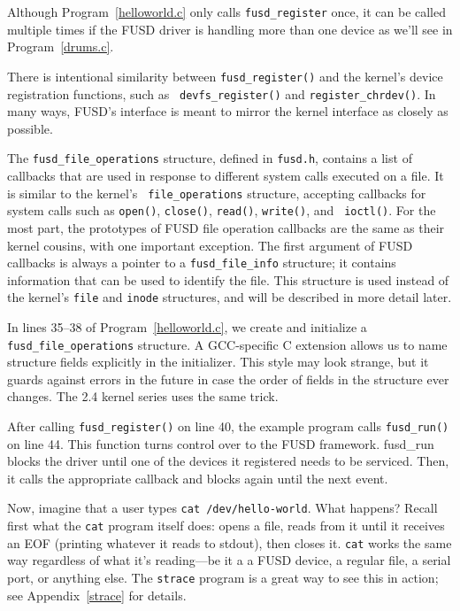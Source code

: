 \documentclass{article}
\begin{document}
Although Program~\ref{helloworld.c} only calls {\tt fusd\_register}
once, it can be called multiple times if the FUSD driver is handling
more than one device as we'll see in Program~\ref{drums.c}.

There is intentional similarity between {\tt fusd\_register()} and the
kernel's device registration functions, such as {\tt
devfs\_register()} and {\tt register\_chrdev()}.  In many ways, FUSD's
interface is meant to mirror the kernel interface as closely as
possible.

The {\tt fusd\_file\_operations} structure, defined in {\tt fusd.h},
contains a list of callbacks that are used in response to different
system calls executed on a file.  It is similar to the kernel's {\tt
file\_operations} structure, accepting callbacks for system calls such
as {\tt open()}, {\tt close()}, {\tt read()}, {\tt write()}, and {\tt
ioctl()}.  For the most part, the prototypes of FUSD file operation
callbacks are the same as their kernel cousins, with one important
exception.  The first argument of FUSD callbacks is always a pointer
to a {\tt fusd\_file\_info} structure; it contains information that
can be used to identify the file.  This structure is used instead of
the kernel's {\tt file} and {\tt inode} structures, and will be
described in more detail later.

In lines 35--38 of Program~\ref{helloworld.c}, we create and
initialize a {\tt fusd\_file\_operations} structure.  A GCC-specific C
extension allows us to name structure fields explicitly in the
initializer.  This style may look strange, but it guards against
errors in the future in case the order of fields in the structure ever
changes.  The 2.4 kernel series uses the same trick.

After calling {\tt fusd\_register()} on line 40, the example program
calls {\tt fusd\_run()} on line 44.  This function turns control over
to the FUSD framework.  fusd\_run blocks the driver until one of the
devices it registered needs to be serviced.  Then, it calls the
appropriate callback and blocks again until the next event.

Now, imagine that a user types {\tt cat /dev/hello-world}.  What
happens?  Recall first what the {\tt cat} program itself does: opens a
file, reads from it until it receives an EOF (printing whatever it
reads to stdout), then closes it.  {\tt cat} works the same way
regardless of what it's reading---be it a a FUSD device, a regular
file, a serial port, or anything else.  The {\tt strace} program is a
great way to see this in action; see Appendix~\ref{strace} for
details.
\end{document}
